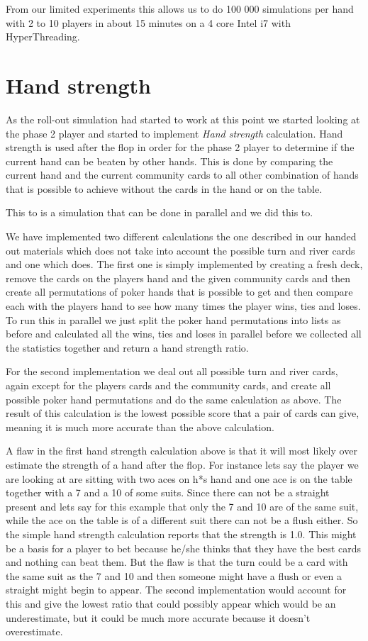 \documentclass[titlepage, a4paper]{article}
\begin{document}
From our limited experiments this allows us to do 100 000 simulations per hand with
2 to 10 players in about 15 minutes on a 4 core Intel i7 with HyperThreading.

\section{Hand strength}\label{hand strength}
As the roll-out simulation had started to work at this point we started looking at
the phase 2 player and started to implement \textit{Hand strength} calculation.
Hand strength is used after the flop in order for the phase 2 player to determine if
the current hand can be beaten by other hands. This is done by comparing the current
hand and the current community cards to all other combination of hands that is possible
to achieve without the cards in the hand or on the table. 

This to is a simulation that can be done in parallel and we did this to. 

We have implemented two different
calculations the one described in our handed out materials which does not take into
account the possible turn and river cards and one which does. The first one is simply
implemented by creating a fresh deck, remove the cards on the players hand and the
given community cards and then create all permutations of poker hands that is possible
to get and then compare each with the players hand to see how many times the player
wins, ties and loses. To run this in parallel we just split the poker hand permutations
into lists as before and calculated all the wins, ties and loses in parallel before
we collected all the statistics together and return a hand strength ratio.

For the second implementation we deal out all possible turn and river cards, again
except for the players cards and the community cards, and create all possible poker
hand permutations and do the same calculation as above. The result of this calculation
is the lowest possible score that a pair of cards can give, meaning it is much more
accurate than the above calculation.

A flaw in the first hand strength calculation above is that it will most likely
over estimate the strength of a hand after the flop. For instance lets say the player
we are looking at are sitting with two aces on h*s hand and one ace is on the table
together with a 7 and a 10 of some suits. Since there can not be a straight present
and lets say for this example that only the 7 and 10 are of the same suit, while
the ace on the table is of a different suit there can not be a flush either. So the
simple hand strength calculation reports that the strength is 1.0. This might be
a basis for a player to bet because he/she thinks that they have the best cards and
nothing can beat them. But the flaw is that the turn could be a card with the same suit
as the 7 and 10 and then someone might have a flush or even a straight might begin to
appear. The second implementation would account for this and give the lowest ratio
that could possibly appear which would be an underestimate, but it could be
much more accurate because it doesn't overestimate.
\end{document}
